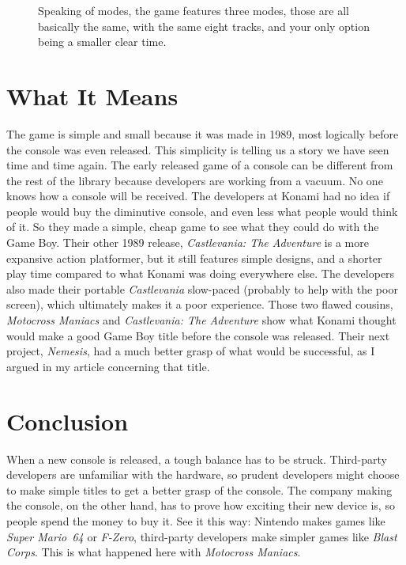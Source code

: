 \documentclass{book}
\begin{document}
\FloatBarrier\vspace{\baselineskip}\begin{figure}[H]\caption*{Speaking of modes, the game features three modes, those are all basically the same, with the same eight tracks, and your only option being a smaller clear time.}\end{figure}
\FloatBarrier\section*{What It Means}
The game is simple and small because it was made in 1989, most logically before the console was even released. This simplicity is telling us a story we have seen time and time again. The early released game of a console can be different from the rest of the library because developers are working from a vacuum. No one knows how a console will be received. The developers at Konami had no idea if people would buy the diminutive console, and even less what people would think of it. So they made a simple, cheap game to see what they could do with the Game Boy. Their other 1989 release, \emph{Castlevania: The Adventure} is a more expansive action platformer, but it still features simple designs, and a shorter play time compared to what Konami was doing everywhere else. The developers also made their portable \emph{Castlevania} slow-paced (probably to help with the poor screen), which ultimately makes it a poor experience. Those two flawed cousins, \emph{Motocross Maniacs} and \emph{Castlevania: The Adventure} show what Konami thought would make a good Game Boy title before the console was released. Their next project, \emph{Nemesis}, had a much better grasp of what would be successful, as I argued in my article concerning that title.\par
\FloatBarrier\section*{Conclusion}
When a new console is released, a tough balance has to be struck. Third-party developers are unfamiliar with the hardware, so prudent developers might choose to make simple titles to get a better grasp of the console. The company making the console, on the other hand, has to prove how exciting their new device is, so people spend the money to buy it. See it this way: Nintendo makes games like \emph{Super Mario~64} or \emph{F-Zero}, third-party developers make simpler games like \emph{Blast Corps}. This is what happened here with \emph{Motocross Maniacs}.\par
\end{document}
